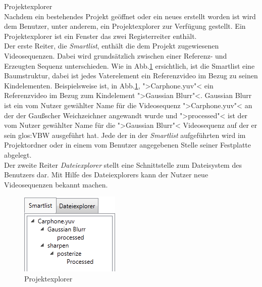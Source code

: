  Projektexplorer \\
Nachdem ein bestehendes Projekt geöffnet oder ein neues erstellt worden ist wird dem
Benutzer, unter anderem, ein Projektexplorer zur Verfügung gestellt. Ein Projektexplorer ist ein 
Fenster das zwei Registerreiter enthält. \\
Der erste Reiter, die \emph{Smartlist}, enthält die dem Projekt zugewiesenen Videosequenzen. Dabei wird
grundsätzlich zwischen einer Referenz- und Erzeugten Sequenz unterschieden. Wie in Abb.\ref{pExplorer}
ersichtlich, ist die Smartlist eine Baumstruktur, dabei ist jedes Vaterelement
ein Referenzvideo im Bezug zu seinen Kindelementen. Beispielsweise ist, in Abb.\ref{pExplorer}, 
">Carphone.yuv"< ein Referenzvideo im Bezug zum Kindelement ">Gaussian Blurr"<. Gaussian Blurr ist ein
vom Nutzer gewählter Name für die Videosequenz ">Carphone.yuv"< an der der Gaußscher Weichzeichner angewandt
wurde und ">processed"< ist der vom Nutzer gewählter Name für die ">Gaussian Blurr"< Videosequenz auf
der er sein \gls{glos:VBW} ausgeführt hat. Jede der in der \emph{Smartlist} aufgeführten wird im Projektordner
oder in einem vom Benutzer angegebenen Stelle seiner Festplatte abgelegt.\\
Der zweite Reiter \emph{Dateiexplorer} stellt eine Schnittstelle zum Dateisystem des Benutzers dar. Mit Hilfe
des Dateiexplorers kann der Nutzer \projektTitel neue Videosequenzen bekannt machen.
\begin{figure}[h]
\includegraphics[scale=1]{bilder/projektexplorer.png}
\caption{Projektexplorer}
\label{pExplorer}
\end{figure}

